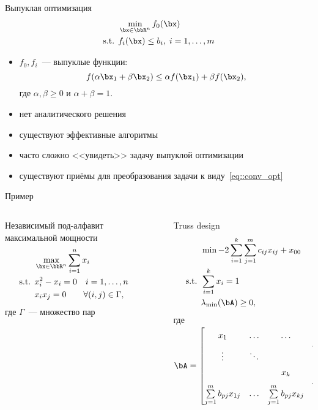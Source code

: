 \documentclass[12pt]{beamer}
\begin{document}
\begin{frame}{Выпуклая оптимизация}
\begin{equation}
\begin{split}
&\min\limits_{\bx \in \bbR^n} f_0(\bx)\\
\text{s.t. } & f_i(\bx) \leq b_i, \; i = 1,\ldots, m
\end{split}
\label{eq::conv_opt}
\end{equation}
\begin{itemize}
\item $f_0, f_i$~--- выпуклые функции:
\[
f(\alpha \bx_1 + \beta \bx_2) \leq \alpha f(\bx_1) + \beta f(\bx_2),
\]
где $\alpha, \beta \geq 0$ и $\alpha + \beta = 1$.
\item нет аналитического решения
\item существуют эффективные алгоритмы
\item часто сложно <<увидеть>> задачу выпуклой оптимизации
\item существуют приёмы для преобразования задачи к виду~\eqref{eq::conv_opt}
\end{itemize}
\end{frame}

\begin{frame}{Пример}

\begin{columns}[T]
\begin{column}{0.5\textwidth}
Независимый под-алфавит максимальной мощности
\begin{equation*}
\begin{split}
&\max\limits_{\bx \in \bbR^n} \sum\limits_{i=1}^n x_i\\
\text{s.t. } & x_i^2 - x_i = 0 \quad i = 1,\ldots, n\\
& x_ix_j = 0 \qquad \forall (i, j) \in \Gamma,
\end{split}
\end{equation*}
где $\Gamma$~--- множество пар
\end{column}
~
\begin{column}{0.5\textwidth}
\small
Truss design
\begin{equation*}
\begin{split}
& \min -2\sum\limits_{i=1}^k\sum\limits_{j=1}^m c_{ij} x_{ij} + x_{00}\\
\text{s.t. } & \sum\limits_{i=1}^k x_i = 1\\
& \lambda_{\min}(\bA) \geq 0,
\end{split}
\end{equation*}
\scriptsize
где $\bA = 
\begin{bmatrix}
x_1 & \ldots & \ldots & \sum\limits_{j=1}^m b_{pj}x_{1j}\\
\vdots & \ddots & & \vdots\\
 & & x_k & \sum\limits_{j=1}^m b_{pj}x_{kj}\\
\sum\limits_{j=1}^m b_{pj}x_{1j} & \ldots & \sum\limits_{j=1}^m b_{pj}x_{kj} & x_{00}
\end{bmatrix}
$
\end{column}
\end{columns}

\end{frame}
\end{document}
